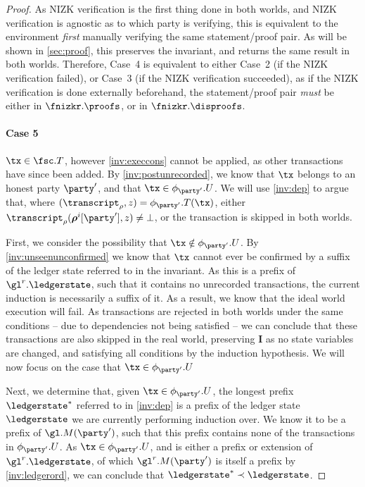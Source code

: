 \begin{proof}
  As NIZK verification is the first thing done in both worlds, and NIZK
  verification is agnostic as to which party is verifying, this is equivalent to
  the environment \emph{first} manually verifying the same statement/proof pair.
  As will be shown in \autoref{sec:proof}, this preserves the invariant, and
  returns the same result in both worlds. Therefore, Case~4 is equivalent to
  either Case~2 (if the NIZK verification failed), or Case~3 (if the NIZK
  verification succeeded), as if the NIZK verification is done externally
  beforehand, the statement/proof pair \emph{must} be either in
  $\fnizkr.\proofs$, or in $\fnizkr.\disproofs$.

  \paragraph{Case 5} $\tx \in \fsc.T$, however
  \ref{inv:execcons} cannot be applied, as other transactions have since been
  added. By \ref{inv:postunrecorded}, we know that $\tx$ belongs to an honest
  party $\party'$, and that $\tx \in \phi_{\party'}.U$. We will use \ref{inv:dep}
  to argue that, where $(\transcript_\rho, z) = \phi_{\party'}.T(\tx)$,
  either $\transcript_\rho(\boldsymbol\rho^i[\party'], z) \neq \bot$, or the
  transaction is skipped in both worlds.

  First, we consider the possibility that $\tx \notin \phi_{\party'}.U$. By
  \ref{inv:unseenunconfirmed} we know that $\tx$ cannot ever be confirmed by a
  suffix of the ledger state referred to in the invariant. As this is a prefix
  of $\gl^r.\ledgerstate$, such that it contains no unrecorded transactions, the
  current induction is necessarily a suffix of it. As a result, we know that the
  ideal world execution will fail. As transactions are rejected in both worlds
  under the same conditions -- due to dependencies not being satisfied
  -- we can conclude that these transactions
  are also skipped in the real world, preserving $\boldsymbol I$ as no state
  variables are changed, and satisfying all conditions by the induction
  hypothesis. We will now focus on the case that $\tx \in \phi_{\party'}.U$

  Next, we determine that, given $\tx \in \phi_{\party'}.U$, the longest prefix
  $\ledgerstate^*$ referred to in \ref{inv:dep} is a prefix of the ledger state
  $\ledgerstate$ we are currently performing induction over. We know it to be a
  prefix of $\gl.M(\party')$, such that this prefix contains none of the
  transactions in $\phi_{\party'}.U$. As $\tx \in \phi_{\party'}.U$, and is
  either a prefix or extension of $\gl^r.\ledgerstate$, of which
  $\gl^r.M(\party')$ is itself a prefix by \ref{inv:ledgerord}, we can conclude
  that $\ledgerstate^* \prec \ledgerstate$.


\end{proof}
